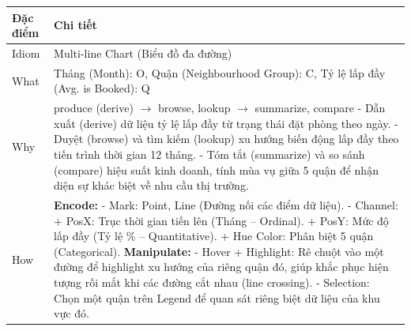 \begin{longtable}{|p{2.8cm}|p{11.5cm}|}
\hline
\textbf{Đặc điểm} & \textbf{Chi tiết} \\
\hline
\endhead
\hline
\endfoot
Idiom & Multi-line Chart (Biểu đồ đa đường) \\
\hline
What & Tháng (Month): O, Quận (Neighbourhood Group): C, Tỷ lệ lấp đầy (Avg. is Booked): Q \\
\hline
Why & produce (derive) $\rightarrow$ browse, lookup $\rightarrow$ summarize, compare \newline
\newline
- Dẫn xuất (derive) dữ liệu tỷ lệ lấp đầy từ trạng thái đặt phòng theo ngày. \newline
\newline
- Duyệt (browse) và tìm kiếm (lookup) xu hướng biến động lấp đầy theo tiến trình thời gian 12 tháng. \newline
\newline
- Tóm tắt (summarize) và so sánh (compare) hiệu suất kinh doanh, tính mùa vụ giữa 5 quận để nhận diện sự khác biệt về nhu cầu thị trường. \\
\hline
How & \textbf{Encode:} \newline
\newline
- Mark: Point, Line (Đường nối các điểm dữ liệu). \newline
\newline
- Channel: \newline
\newline
\hspace{0.3cm} + PosX: Trục thời gian tiến lên (Tháng -- Ordinal). \newline
\newline
\hspace{0.3cm} + PosY: Mức độ lấp đầy (Tỷ lệ \% -- Quantitative). \newline
\newline
\hspace{0.3cm} + Hue Color: Phân biệt 5 quận (Categorical). \newline
\newline
\textbf{Manipulate:} \newline
\newline
- Hover + Highlight: Rê chuột vào một đường để highlight xu hướng của riêng quận đó, giúp khắc phục hiện tượng rối mắt khi các đường cắt nhau (line crossing). \newline
\newline
- Selection: Chọn một quận trên Legend để quan sát riêng biệt dữ liệu của khu vực đó. \newline

\end{longtable}
